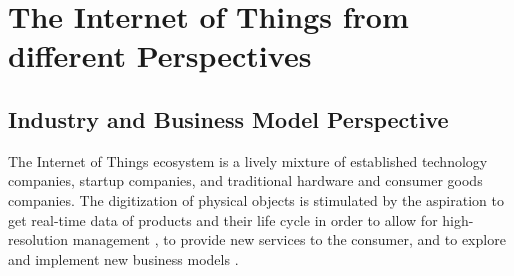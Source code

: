 \section{The Internet of Things from different Perspectives}













\subsection{Industry and Business Model Perspective}

The Internet of Things ecosystem is a lively mixture of established technology companies, startup companies, and traditional hardware and consumer goods companies. The digitization of physical objects is stimulated by the aspiration to get real-time data of products and their life cycle in order to allow for high-resolution management \parencite{fleisch2010internet}, to provide new services to the consumer, and to explore and implement new business models \parencite{Fleisch2015}.	

